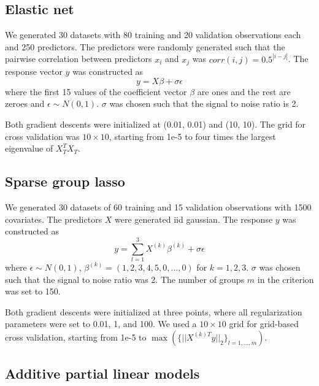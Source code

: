 \documentclass[10pt,letterpaper]{article}
\begin{document}
\subsection{Elastic net}
We generated 30 datasets with 80 training and 20 validation observations each and 250 predictors. The predictors were randomly generated such that the pairwise correlation between predictors $x_i$ and $x_j$ was $corr(i,j) = 0.5^{|i-j|}$. The response vector $y$ was constructed as
\begin{equation}
y = X\beta + \sigma \epsilon
\end{equation}
where the first 15 values of the coefficient vector $\beta$ are ones and the rest are zeroes and $\epsilon \sim N(0, 1)$. $\sigma$ was chosen such that the signal to noise ratio is 2. 

Both gradient descents were initialized at (0.01, 0.01) and (10, 10). The grid for cross validation was $10 \times 10$, starting from 1e-5 to four times the largest eigenvalue of $X_T^T X_T$.

\subsection{Sparse group lasso}

We generated 30 datasets of 60 training and 15 validation observations with 1500 covariates. The predictors $X$ were generated iid gaussian. The response $y$ was constructed as
\begin{equation}
y = \sum\limits_{l=1}^3 X^{(k)} \beta^{(k)} + \sigma \epsilon
\end{equation}
where $\epsilon \sim N(0, 1)$, $\beta^{(k)} = (1, 2, 3, 4, 5, 0, ..., 0)$ for $k = 1, 2, 3$. $\sigma$ was chosen such that the signal to noise ratio was 2. The number of groups $m$ in the criterion was set to 150.

Both gradient descents were initialized at three points, where all regularization parameters were set to 0.01, 1, and 100. We used a $10 \times 10$ grid for grid-based cross validation, starting from 1e-5 to $\max(\{||X^{(k)T}y ||_2\}_{l=1,..., m})$.

\subsection{Additive partial linear models}
\end{document}
